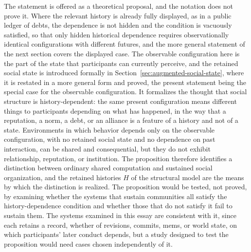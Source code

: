 \documentclass[11pt]{article}
\theoremstyle{remark}
\newcommand{\Hh}{H}
\begin{document}
The statement is offered as a theoretical proposal, and the notation does not prove it. Where the relevant history is already fully displayed, as in a public ledger of debts, the dependence is not hidden and the condition is vacuously satisfied, so that only hidden historical dependence requires observationally identical configurations with different futures, and the more general statement of the next section covers the displayed case. The observable configuration here is the part of the state that participants can currently perceive, and the retained social state is introduced formally in Section~\ref{sec:augmented-social-state}, where it is restated in a more general form and proved, the present statement being the special case for the observable configuration. It formalizes the thought that social structure is history-dependent: the same present configuration means different things to participants depending on what has happened, in the way that a reputation, a norm, a debt, or an alliance is a feature of a history and not of a state. Environments in which behavior depends only on the observable configuration, with no retained social state and no dependence on past interaction, can be shared and consequential, but they do not exhibit relationship, reputation, or institution. The proposition therefore identifies a distinction between ordinary shared computation and sustained social organization, and the retained histories $\Hh$ of the structural model are the means by which the distinction is realized. The proposition would be tested, not proved, by examining whether the systems that sustain communities all satisfy the history-dependence condition and whether those that do not satisfy it fail to sustain them. The systems examined in this essay are consistent with it, since each retains a record, whether of revisions, commits, mems, or world state, on which participants' later conduct depends, but a study designed to test the proposition would need cases chosen independently of it.
\end{document}

